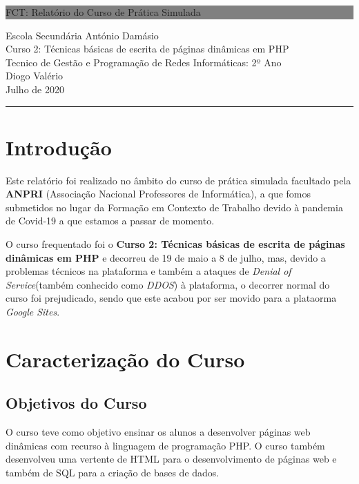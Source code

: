 \documentclass[14pt]{article}
\begin{document}
\begin{titlepage}

	\colorbox{grey}{
		\parbox[t]{0.93\textwidth}{ %
			\parbox[t]{0.91\textwidth}{ %
				\raggedleft
				\fontsize{60pt}{70pt}\selectfont
				\vspace{0.5cm}

				FCT: Relatório do Curso de Prática Simulada\\


				\vspace{0.5cm}
			}
		}
	}
	\vfill

	\parbox[t]{0.93\textwidth}{
		\raggedleft
		\large
		{\Large
   	Escola Secundária António Damásio\\[4pt]
    \large Curso 2: Técnicas básicas de escrita de páginas dinâmicas em PHP\\[2pt]
    \large Tecnico de Gestão e Programação de Redes Informáticas: 2º Ano\\[2pt]
    \Large Diogo Valério}\\[4pt]
    Julho de 2020\\[1pt]
		\hfill\rule{0.6\linewidth}{1pt}
	}
\end{titlepage}


\tableofcontents
\newpage

\section{Introdução}
Este relatório foi realizado no âmbito do curso de prática simulada facultado pela \textbf{ANPRI} (Associação Nacional Professores de Informática), a que fomos submetidos no lugar da
Formação em Contexto de Trabalho devido à pandemia de Covid-19 a que estamos a passar de momento.

O curso frequentado foi o \textbf{Curso 2: Técnicas básicas de escrita de páginas dinâmicas em PHP} e decorreu de 19 de maio a
8 de julho, mas, devido a problemas técnicos na plataforma e também a ataques de \textit{Denial of Service}(também conhecido como \textit{DDOS})
à plataforma, o decorrer normal do curso foi prejudicado, sendo que este acabou por ser movido para a plataorma \textit{Google Sites}.


\section{Caracterização do Curso}
\subsection{Objetivos do Curso}
O curso teve como objetivo ensinar os alunos a
desenvolver páginas web dinâmicas com recurso à linguagem de programação PHP.
O curso também desenvolveu uma vertente de HTML para o desenvolvimento de páginas web e também de SQL para a criação de bases de dados.
\end{document}
